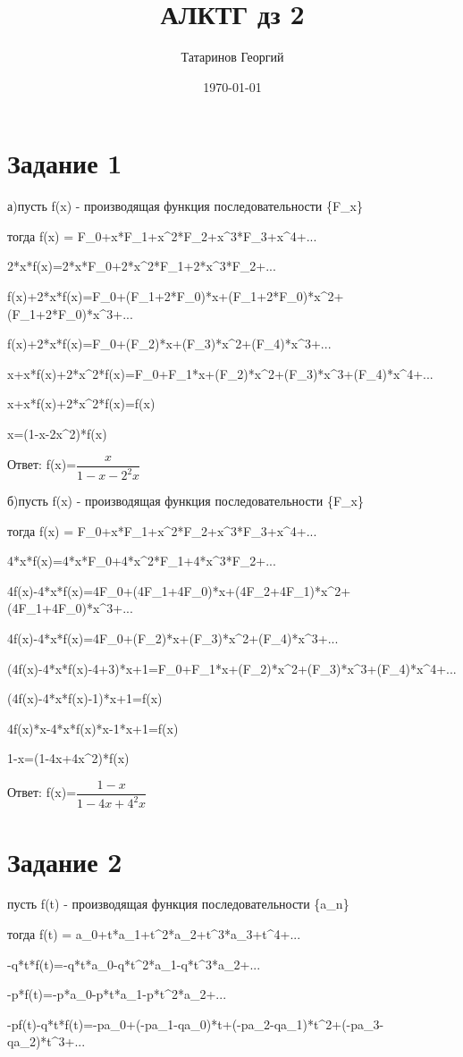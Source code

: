 \documentclass[a4paper, 12pt]{article}
\title{АЛКТГ дз 2}
\author{Татаринов Георгий}
\date{\today}
\newcommand{\ans}{Ответ: }
\begin{document}
	\maketitle
	\section*{Задание 1}
		а)пусть f(x) - производящая функция последовательности \{F_x\}

		тогда f(x) = F_0+x*F_1+x^2*F_2+x^3*F_3+x^4+...

		2*x*f(x)=2*x*F_0+2*x^2*F_1+2*x^3*F_2+...

		f(x)+2*x*f(x)=F_0+(F_1+2*F_0)*x+(F_1+2*F_0)*x^2+(F_1+2*F_0)*x^3+...

		f(x)+2*x*f(x)=F_0+(F_2)*x+(F_3)*x^2+(F_4)*x^3+...

		x+x*f(x)+2*x^2*f(x)=F_0+F_1*x+(F_2)*x^2+(F_3)*x^3+(F_4)*x^4+...

		x+x*f(x)+2*x^2*f(x)=f(x)

		x=(1-x-2x^2)*f(x)

		\ans f(x)=$\dfrac{x}{1-x-2^2x}$

		б)пусть f(x) - производящая функция последовательности \{F_x\}

		тогда f(x) = F_0+x*F_1+x^2*F_2+x^3*F_3+x^4+...

		4*x*f(x)=4*x*F_0+4*x^2*F_1+4*x^3*F_2+...

		4f(x)-4*x*f(x)=4F_0+(4F_1+4F_0)*x+(4F_2+4F_1)*x^2+(4F_1+4F_0)*x^3+...

		4f(x)-4*x*f(x)=4F_0+(F_2)*x+(F_3)*x^2+(F_4)*x^3+...

		(4f(x)-4*x*f(x)-4+3)*x+1=F_0+F_1*x+(F_2)*x^2+(F_3)*x^3+(F_4)*x^4+...

		(4f(x)-4*x*f(x)-1)*x+1=f(x)

		4f(x)*x-4*x*f(x)*x-1*x+1=f(x)

		1-x=(1-4x+4x^2)*f(x)

		\ans f(x)=$\dfrac{1-x}{1-4x+4^2x}$
	\section*{Задание 2}
		пусть f(t) - производящая функция последовательности \{a_n\}

		тогда f(t) = a_0+t*a_1+t^2*a_2+t^3*a_3+t^4+...

		-q*t*f(t)=-q*t*a_0-q*t^2*a_1-q*t^3*a_2+...

		-p*f(t)=-p*a_0-p*t*a_1-p*t^2*a_2+...

		-pf(t)-q*t*f(t)=-pa_0+(-pa_1-qa_0)*t+(-pa_2-qa_1)*t^2+(-pa_3-qa_2)*t^3+...
\end{document}
